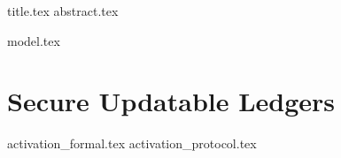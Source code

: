 \documentclass[runningheads]{llncs}
\begin{document}
{title.tex}
{abstract.tex}
\clearpage



{model.tex}

\section{Secure Updatable Ledgers}
{activation_formal.tex}
{activation_protocol.tex}


\clearpage




\appendix



\end{document}
